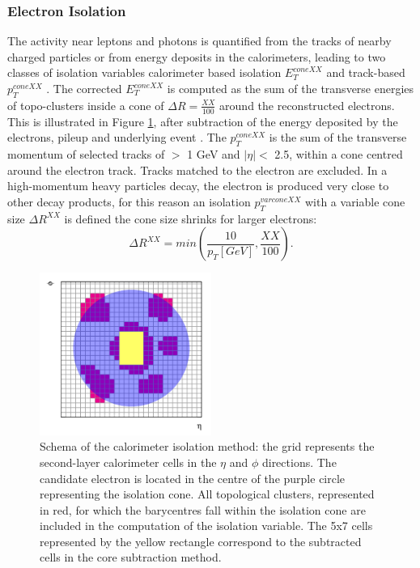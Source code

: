 \subsubsection{Electron Isolation}
\label{chap2:Objects:Egamma:EIso}
The activity near leptons and photons is quantified from the tracks of nearby charged particles or from energy deposits in the calorimeters, leading to two classes of isolation variables calorimeter based isolation $E^{coneXX}_{T}$ and track-based $p_T^{coneXX}$ \cite{Electron_Reco_Id_Run1}. The corrected $E^{coneXX}_{T}$ is computed as the sum of the transverse energies of topo-clusters inside a cone of $\Delta R = \frac{XX}{100}$ around the reconstructed electrons. This is illustrated in Figure \ref{fig:chap2:Objects:Egamma:EIso:Schema}, after subtraction of the energy deposited by the electrons, pileup and underlying event \cite{PileUp_IsoExtract}. The $p_T^{coneXX}$ is the sum of the transverse momentum of selected tracks of \pT $>$ 1 GeV and $|\eta|<$ 2.5, within a cone centred around the electron track. Tracks matched to the electron are excluded. In a high-momentum heavy particles decay, the electron is produced very close to other decay products, for this reason an isolation $p_T^{varconeXX}$ with a variable cone size $\Delta R^{XX}$ is defined the cone size shrinks for larger \pT electrons:
\begin{equation}
    \Delta R^{XX} = min(\frac{10}{p_T[GeV]}, \frac{XX}{100}).
\end{equation}
\begin{figure}[htbp]
    \centering
    \includegraphics[width=0.5\textwidth]{Ch2/Img/Iso_Schema.png}
    \caption{Schema of the calorimeter isolation method: the grid represents the second-layer calorimeter cells in the $\eta$ and $\phi$ directions. The candidate electron is located in the centre of the purple circle representing the isolation cone. All topological clusters, represented in red, for which the barycentres fall within the isolation cone are included in the computation of the isolation variable. The 5x7 cells represented by the yellow rectangle correspond to the subtracted cells in the core subtraction method.}
    \label{fig:chap2:Objects:Egamma:EIso:Schema}
\end{figure}

